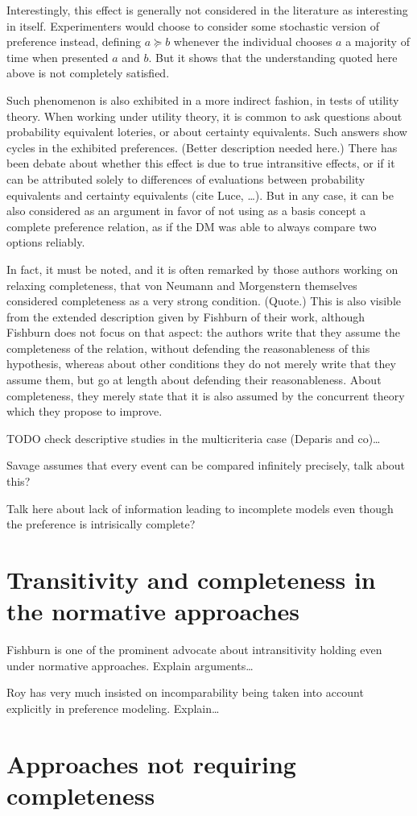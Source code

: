 \documentclass[french, english]{llncs}
\begin{document}
Interestingly, this effect is generally not considered in the literature as interesting in itself. Experimenters would choose to consider some stochastic version of preference instead, defining $a \succeq b$ whenever the individual chooses $a$ a majority of time when presented $a$ and $b$. But it shows that the understanding quoted here above is not completely satisfied.

Such phenomenon is also exhibited in a more indirect fashion, in tests of utility theory. When working under utility theory, it is common to ask questions about probability equivalent loteries, or about certainty equivalents. Such answers show cycles in the exhibited preferences. (Better description needed here.) There has been debate about whether this effect is due to true intransitive effects, or if it can be attributed solely to differences of evaluations between probability equivalents and certainty equivalents (cite Luce, …). But in any case, it can be also considered as an argument in favor of not using as a basis concept a complete preference relation, as if the \ac{DM} was able to always compare two options reliably.

In fact, it must be noted, and it is often remarked by those authors working on relaxing completeness, that von Neumann and Morgenstern themselves considered completeness as a very strong condition. (Quote.) This is also visible from the extended description given by Fishburn of their work, although Fishburn does not focus on that aspect: the authors write that they assume the completeness of the relation, without defending the reasonableness of this hypothesis, whereas about other conditions they do not merely write that they assume them, but go at length about defending their reasonableness. About completeness, they merely state that it is also assumed by the concurrent theory which they propose to improve.

TODO check descriptive studies in the multicriteria case (Deparis and co)…

Savage assumes that every event can be compared infinitely precisely, talk about this?

Talk here about lack of information leading to incomplete models even though the preference is intrisically complete?

\section{Transitivity and completeness in the normative approaches}
Fishburn is one of the prominent advocate about intransitivity holding even under normative approaches. Explain arguments…

Roy has very much insisted on incomparability being taken into account explicitly in preference modeling. Explain…

\section{Approaches not requiring completeness}
\end{document}
